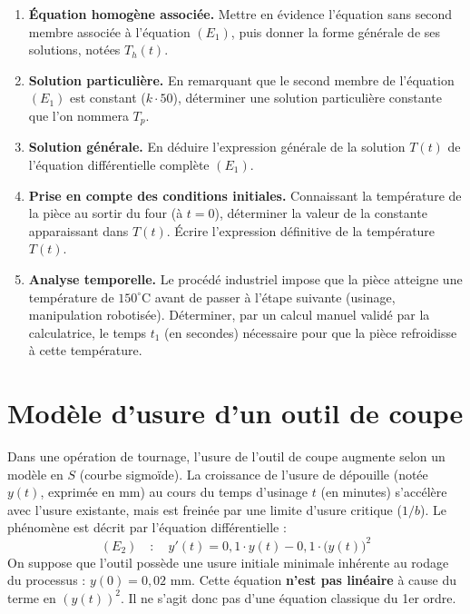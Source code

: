 \documentclass[a4paper,11pt]{article}
\begin{document}
\begin{enumerate}
    \item \textbf{Équation homogène associée.} Mettre en évidence l'équation sans second membre associée à l'équation $(E_1)$, puis donner la forme générale de ses solutions, notées $T_h(t)$.
    
    \vspace{3.5cm}
    
    \item \textbf{Solution particulière.} En remarquant que le second membre de l'équation $(E_1)$ est constant ($k \cdot 50$), déterminer une solution particulière constante que l'on nommera $T_p$.
    
    \vspace{3.5cm}
    
    \item \textbf{Solution générale.} En déduire l'expression générale de la solution $T(t)$ de l'équation différentielle complète $(E_1)$.
    
    \vspace{3.5cm}
    
    \item \textbf{Prise en compte des conditions initiales.} Connaissant la température de la pièce au sortir du four (à $t=0$), déterminer la valeur de la constante apparaissant dans $T(t)$. Écrire l'expression définitive de la température $T(t)$.
    
    \vspace{4.5cm}
    
    \item \textbf{Analyse temporelle.} Le procédé industriel impose que la pièce atteigne une température de $150^{\circ}\text{C}$ avant de passer à l'étape suivante (usinage, manipulation robotisée). Déterminer, par un calcul manuel validé par la calculatrice, le temps $t_1$ (en secondes) nécessaire pour que la pièce refroidisse à cette température.
\end{enumerate}

\newpage

\section{Modèle d'usure d'un outil de coupe}

Dans une opération de tournage, l'usure de l'outil de coupe augmente selon un modèle en \(S\) (courbe sigmoïde). La croissance de l'usure de dépouille (notée $y(t)$, exprimée en mm) au cours du temps d'usinage $t$ (en minutes) s'accélère avec l'usure existante, mais est freinée par une limite d'usure critique ($1/b$). Le phénomène est décrit par l'équation différentielle :
\[
(E_2) \quad : \quad y'(t) = 0,1 \cdot y(t) - 0,1 \cdot \big(y(t)\big)^2
\]
On suppose que l'outil possède une usure initiale minimale inhérente au rodage du processus : $y(0) = 0,02 \text{ mm}$.
Cette équation \textbf{n'est pas linéaire} à cause du terme en $(y(t))^2$. Il ne s'agit donc pas d'une équation classique du 1er ordre.
\end{document}
